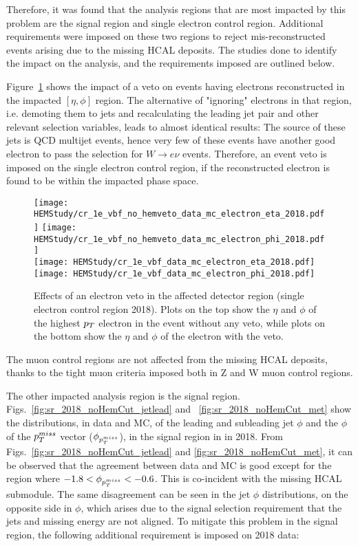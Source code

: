 Therefore, it was found that the analysis regions that are most impacted by this problem are the signal region and single 
electron control region. Additional requirements were imposed on these two regions to reject mis-reconstructed events arising
due to the missing HCAL deposits. The studies done to identify the impact on the analysis, and the requirements imposed are
outlined below. 

Figure~\ref{fig:HEM_motivation} shows the impact of a veto on 
events having electrons reconstructed in the impacted $[\eta,\phi]$ region. 
The alternative of "ignoring" electrons in that region, i.e. demoting them to jets 
and recalculating the leading jet pair and other relevant selection variables, 
leads to almost identical results: The source of these jets is QCD multijet events, 
hence very few of these events have another good electron to pass the selection for 
$W \rightarrow e \nu$ events. Therefore, an event veto is imposed on the single electron
control region, if the reconstructed electron is found to be within the impacted phase space.

\begin{figure}[htbp]
    \begin{center}
        \texttt{[image: HEMStudy/cr\_1e\_vbf\_no\_hemveto\_data\_mc\_electron\_eta\_2018.pdf]}
        \texttt{[image: HEMStudy/cr\_1e\_vbf\_no\_hemveto\_data\_mc\_electron\_phi\_2018.pdf]} \\
        \texttt{[image: HEMStudy/cr\_1e\_vbf\_data\_mc\_electron\_eta\_2018.pdf]}
        \texttt{[image: HEMStudy/cr\_1e\_vbf\_data\_mc\_electron\_phi\_2018.pdf]}
    \end{center}
    \caption{Effects of an electron veto in the affected detector region (single electron control region 2018). 
    Plots on the top show the $\eta$ and $\phi$ of the highest $p_T$ electron in the event
    without any veto, while plots on the bottom show the $\eta$ and $\phi$ of the electron with the veto.}
    \label{fig:HEM_motivation}
\end{figure}

The muon control regions are not affected from the missing HCAL deposits, 
thanks to the tight muon criteria imposed both in Z and W muon control regions.

The other impacted analysis region is the signal region. 
Figs.~\ref{fig:sr_2018_noHemCut_jetlead} and ~\ref{fig:sr_2018_noHemCut_met} show the distributions, in data and MC, of the leading and subleading 
jet $\phi$ and the $\phi$ of the $p_T^{miss}$ vector ($\phi_{p_T^{miss}}$), in the signal region in in 2018. 
From Figs.~\ref{fig:sr_2018_noHemCut_jetlead} and \ref{fig:sr_2018_noHemCut_met}, it can be observed that the agreement between data and MC is good 
except for the region where $-1.8 < \phi_{p_T^{miss}} < -0.6$. This is co-incident 
with the missing HCAL submodule. The same disagreement can be seen in the jet $\phi$ distributions, on the opposite side in $\phi$, 
which arises due to the signal selection requirement that the jets and missing energy are not aligned.
To mitigate this problem in the signal region, the following additional requirement is imposed on 2018 data:

